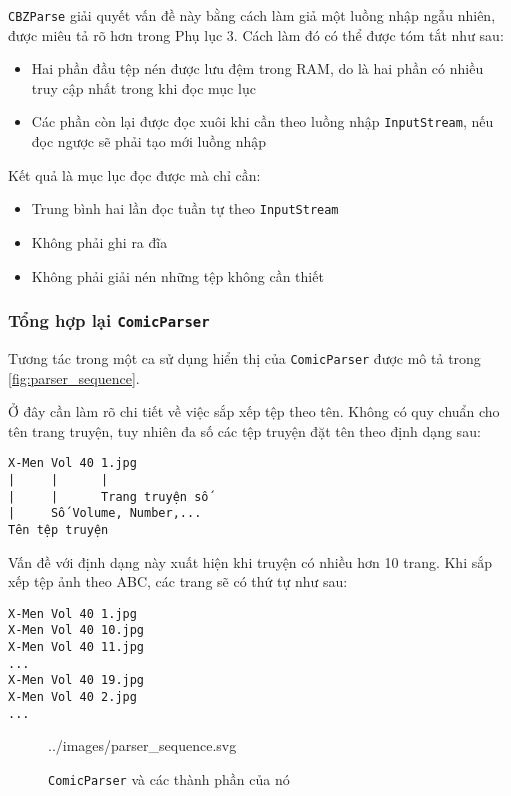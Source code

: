 \documentclass[../../../../thesis]{subfiles}
\begin{document}
\texttt{CBZParse} giải quyết vấn đề này bằng cách làm giả một luồng nhập ngẫu
nhiên, được miêu tả rõ hơn trong Phụ lục 3. Cách làm đó có thể được tóm tắt như
sau:

\begin{itemize}
    \item
        Hai phần đầu tệp nén được lưu đệm trong RAM, do là hai phần có nhiều
        truy cập nhất trong khi đọc mục lục
    \item
        Các phần còn lại được đọc xuôi khi cần theo luồng nhập
        \texttt{InputStream}, nếu đọc ngược sẽ phải tạo mới luồng nhập
\end{itemize}

Kết quả là mục lục đọc được mà chỉ cần:

\begin{itemize}
    \item
        Trung bình hai lần đọc tuần tự theo \texttt{InputStream}
    \item
        Không phải ghi ra đĩa
    \item
        Không phải giải nén những tệp không cần thiết
\end{itemize}

\subsubsection{Tổng hợp lại \texttt{ComicParser}}

Tương tác trong một ca sử dụng hiển thị của \texttt{ComicParser} được mô tả
trong \autoref{fig:parser_sequence}.

Ở đây cần làm rõ chi tiết về việc sắp xếp tệp theo tên. Không có quy chuẩn cho
tên trang truyện, tuy nhiên đa số các tệp truyện đặt tên theo định dạng sau:

\begin{verbatim}
X-Men Vol 40 1.jpg
|     |      |
|     |      Trang truyện số
|     Số Volume, Number,...
Tên tệp truyện
\end{verbatim}

Vấn đề với định dạng này xuất hiện khi truyện có nhiều hơn 10 trang. Khi sắp xếp
tệp ảnh theo ABC, các trang sẽ có thứ tự như sau:

\begin{verbatim}
X-Men Vol 40 1.jpg
X-Men Vol 40 10.jpg
X-Men Vol 40 11.jpg
...
X-Men Vol 40 19.jpg
X-Men Vol 40 2.jpg
...
\end{verbatim}

\begin{figure}[H]
    \centering
    
        {../images/parser_sequence.svg}
    \caption{\texttt{ComicParser} và các thành phần của nó}
    \label{fig:parser_sequence}
\end{figure}
\end{document}
